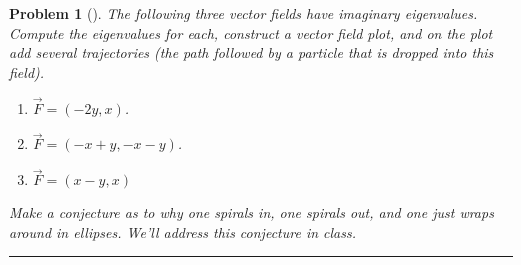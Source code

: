 \documentclass[letterpaper,oneside]{book}%
\theoremstyle{plain}
\theoremstyle{box}
\theoremstyle{problem}
\newtheorem{problemnum}{Problem}[chapter]
\newenvironment{problem}[1][]{\begin{problemnum}[#1]}{\end{problemnum}\nopagebreak\hrule\bigskip}
\begin{document}
\begin{problem}
The following three vector fields have imaginary eigenvalues. Compute the eigenvalues for each, construct a vector field plot, and on the plot add several trajectories (the path followed by a particle that is dropped into this field).
\begin{enumerate}
 \item $\vec F = (-2y,x)$. 
 \item $\vec F = (-x+y, -x-y)$.
 \item $\vec F = (x-y, x)$ 
\end{enumerate}
Make a conjecture as to why one spirals in, one spirals out, and one just wraps around in ellipses. We'll address this conjecture in class.
\end{problem}
\end{document}
